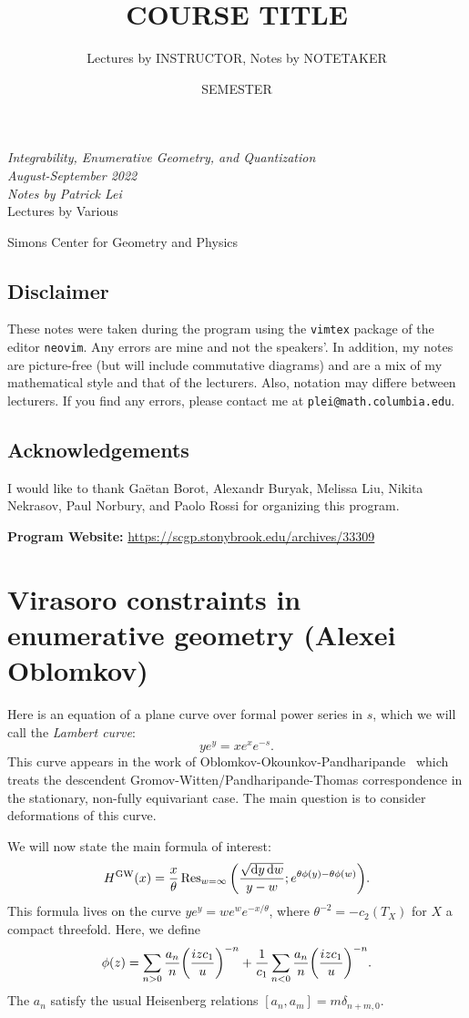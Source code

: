 \documentclass[leqno, openany]{memoir}
\title{COURSE TITLE}
\author{Lectures by INSTRUCTOR, Notes by NOTETAKER}
\date{SEMESTER}
\theoremstyle{definition}
\theoremstyle{remark}
\theoremstyle{plain}
\theoremstyle{definition}
\theoremstyle{remark}
\newcommand{\mr}[1]{\mathrm{#1}}
\newcommand*{\titleSW}
    {\begingroup%
    \raggedleft
    \vspace*{\baselineskip}
    {\Huge\itshape Integrability, Enumerative Geometry, and Quantization \\ August-September 2022}\\[\baselineskip]
    {\large\itshape Notes by Patrick Lei}\\[0.2\textheight]
    {\Large Lectures by Various}\par
    \vfill
    {\Large \sffamily Simons Center for Geometry and Physics}
    \vspace*{\baselineskip}
\endgroup}
\begin{document}
    
\begin{titlingpage}
\titleSW
\end{titlingpage}

\thispagestyle{empty}
\section*{Disclaimer}%
\label{sec:disclaimer}

These notes were taken during the program using the \texttt{vimtex} package of the editor \texttt{neovim}. 
Any errors are mine and not the speakers'. 
In addition, my notes are picture-free (but will include commutative diagrams) and are a mix of my mathematical style and that of the lecturers. Also, notation may differe between lecturers.
If you find any errors, please contact me at \texttt{plei@math.columbia.edu}.

\section*{Acknowledgements}

I would like to thank Ga\"etan Borot, Alexandr Buryak, Melissa Liu, Nikita Nekrasov, Paul Norbury, and Paolo Rossi for organizing this program.

\vspace*{1cm}

\noindent\textbf{Program Website:}  \url{https://scgp.stonybrook.edu/archives/33309}
\newpage

\tableofcontents

\chapter{Virasoro constraints in enumerative geometry (Alexei Oblomkov)}%
\label{cha:alexei}

Here is an equation of a plane curve over formal power series in $s$, which we will call the \textit{Lambert curve}:
\[ ye^y = xe^x e^{-s}. \]
This curve appears in the work of Oblomkov-Okounkov-Pandharipande~\cite{gwptdescendent} which treats the descendent Gromov-Witten/Pandharipande-Thomas correspondence in the stationary, non-fully equivariant case. The main question is to consider deformations of this curve.

We will now state the main formula of interest:
\begin{equation}\label{eqn:maineqn} 
    H^{\mr{GW}}(x) = \frac{x}{\theta} \Res_{w=\infty} \qty(\frac{\sqrt{\dd{y} \dd{w}}}{y-w}; e^{\theta \phi(y) - \theta \phi(w)}). 
\end{equation}
This formula lives on the curve $ye^{y} = we^{w} e^{-x/\theta}$, where $\theta^{-2} = -c_2(T_X)$ for $X$ a compact threefold. Here, we define
\[ \phi(z) = \sum_{n > 0} \frac{a_n}{n} \qty(\frac{izc_1}{u})^{-n} + \frac{1}{c_1} \sum_{n < 0} \frac{a_n}{n} \qty(\frac{izc_1}{u})^{-n}. \]
The $a_n$ satisfy the usual Heisenberg relations $[a_n, a_m] = m \delta_{n+m, 0}$.
\end{document}
